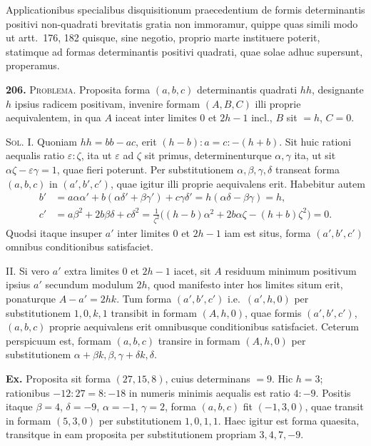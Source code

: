 \documentclass[12pt,a4paper]{article}
\theoremstyle{plain}
\theoremstyle{definition}
\theoremstyle{remark}
\begin{document}
Applicationibus specialibus disquisitionum praecedentium de formis determinantis positivi non-quadrati brevitatis gratia non immoramur, quippe quas simili modo ut artt.~176, 182 quisque, sine negotio, proprio marte instituere poterit, statimque ad formas determinantis positivi quadrati, quae solae adhuc supersunt, properamus.

\textbf{206.} \textsc{Problema.} Proposita forma $(a,b,c)$ determinantis quadrati $hh$, designante $h$ ipsius radicem positivam, invenire formam $(A,B,C)$ illi proprie aequivalentem, in qua $A$ iaceat inter limites $0$ et $2h-1$ incl., $B$ sit $=h$, $C=0$.

\textsc{Sol.} I. Quoniam $hh=bb-ac$, erit $(h-b):a=c:-(h+b)$. Sit huic rationi aequalis ratio $\varepsilon:\zeta$, ita ut $\varepsilon$ ad $\zeta$ sit primus, determinenturque $\alpha,\gamma$ ita, ut sit $\alpha\zeta-\varepsilon\gamma=1$, quae fieri poterunt. Per substitutionem $\alpha,\beta,\gamma,\delta$ transeat forma $(a,b,c)$ in $(a',b',c')$, quae igitur illi proprie aequivalens erit. Habebitur autem
\begin{align*}
b'&=a\alpha\alpha'+b(\alpha\delta'+\beta\gamma')+c\gamma\delta'=h(\alpha\delta-\beta\gamma)=h,\\
c'&=a\beta^2+2b\beta\delta+c\delta^2=\tfrac{1}{\zeta^2}\bigl((h-b)\alpha^2+2b\alpha\zeta-(h+b)\zeta^2\bigr)=0.
\end{align*}
Quodsi itaque insuper $a'$ inter limites $0$ et $2h-1$ iam est situs, forma $(a',b',c')$ omnibus conditionibus satisfaciet.

II. Si vero $a'$ extra limites $0$ et $2h-1$ iacet, sit $A$ residuum minimum positivum ipsius $a'$ secundum modulum $2h$, quod manifesto inter hos limites situm erit, ponaturque $A-a'=2hk$. Tum forma $(a',b',c')$ i.e.\ $(a',h,0)$ per substitutionem $1,0,k,1$ transibit in formam $(A,h,0)$, quae formis $(a',b',c')$, $(a,b,c)$ proprie aequivalens erit omnibusque conditionibus satisfaciet. Ceterum perspicuum est, formam $(a,b,c)$ transire in formam $(A,h,0)$ per substitutionem $\alpha+\beta k,\beta,\gamma+\delta k,\delta$.

\textbf{Ex.} Proposita sit forma $(27,15,8)$, cuius determinans $=9$. Hic $h=3$; rationibus $-12:27=8:-18$ in numeris minimis aequalis est ratio $4:-9$. Positis itaque $\beta=4$, $\delta=-9$, $\alpha=-1$, $\gamma=2$, forma $(a,b,c)$ fit $(-1,3,0)$, quae transit in formam $(5,3,0)$ per substitutionem $1,0,1,1$. Haec igitur est forma quaesita, transitque in eam proposita per substitutionem propriam $3,4,7,-9$.
\end{document}
